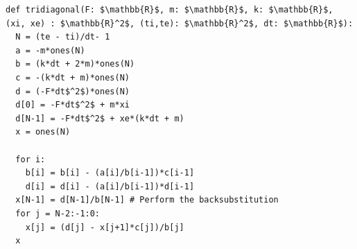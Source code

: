 \documentclass[border=10pt]{standalone}
\begin{document}
\begin{lstlisting}
def tridiagonal(F: $\mathbb{R}$, m: $\mathbb{R}$, k: $\mathbb{R}$, (xi, xe) : $\mathbb{R}^2$, (ti,te): $\mathbb{R}^2$, dt: $\mathbb{R}$):
  N = (te - ti)/dt- 1
  a = -m*ones(N)
  b = (k*dt + 2*m)*ones(N)
  c = -(k*dt + m)*ones(N)
  d = (-F*dt$^2$)*ones(N)
  d[0] = -F*dt$^2$ + m*xi
  d[N-1] = -F*dt$^2$ + xe*(k*dt + m)
  x = ones(N)

  for i:
    b[i] = b[i] - (a[i]/b[i-1])*c[i-1]
    d[i] = d[i] - (a[i]/b[i-1])*d[i-1]  
  x[N-1] = d[N-1]/b[N-1] # Perform the backsubstitution
  for j = N-2:-1:0:
    x[j] = (d[j] - x[j+1]*c[j])/b[j]
  x
\end{lstlisting}
\end{document}
